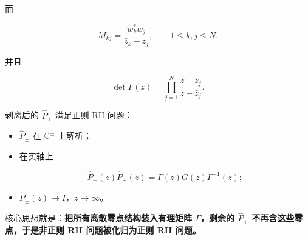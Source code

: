 \documentclass[
    lang=cn,
    scheme=chinese,
    mode=simple,
    device=normal,
    color=blue,
    math=cm,
    thmcnt=section,
    12pt,
    nowatermark
]{elegantbook}
\begin{document}
而

\[
    M_{kj}
    =
    \dfrac{w_k^*w_j}{\bar z_k-z_j},
    \qquad
    1\le k,j\le N.
\]

并且

\[
    \det\Gamma(z)
    =
    \prod\limits_{j=1}^{N}
    \dfrac{z-z_j}{z-\bar z_j}.
\]

剥离后的 $\widehat P_\pm$ 满足正则 RH 问题：

\begin{itemize}
    \item $\widehat P_\pm$ 在 $\mathbb{C}^\pm$ 上解析；
    \item 在实轴上

          \[
              \widehat P_-(z)\widehat P_+(z)
              =
              \Gamma(z)G(z)\Gamma^{-1}(z);
          \]

    \item $\widehat P_\pm(z)\to I$，$z\to\infty$。
\end{itemize}

核心思想就是：\textbf{把所有离散零点结构装入有理矩阵 $\Gamma$，剩余的 $\widehat P_\pm$ 不再含这些零点，于是非正则 RH 问题被化归为正则 RH 问题。}
\end{document}
